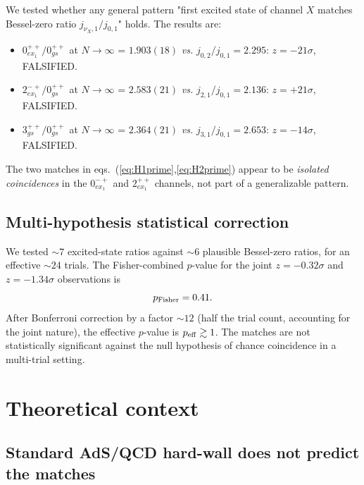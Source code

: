 \documentclass[reprint,prd,amsmath,amssymb,nofootinbib,superscriptaddress]{revtex4-2}
\newcommand{\jbz}[2]{j_{#1,#2}}      %
\begin{document}
We tested whether any general pattern "first excited state of channel $X$ matches Bessel-zero ratio $\jbz{\nu_X}{1}/\jbz{0}{1}$" holds. The results are:

\begin{itemize}
  \item $0^{++}_{ex_1}/0^{++}_{gs}$ at $N \to \infty$ = $1.903(18)$ \emph{vs.} $\jbz{0}{2}/\jbz{0}{1} = 2.295$: $z = -21\sigma$, FALSIFIED.
  \item $2^{-+}_{ex_1}/0^{++}_{gs}$ at $N \to \infty$ = $2.583(21)$ \emph{vs.} $\jbz{2}{1}/\jbz{0}{1} = 2.136$: $z = +21\sigma$, FALSIFIED.
  \item $3^{++}_{gs}/0^{++}_{gs}$ at $N \to \infty$ = $2.364(21)$ \emph{vs.} $\jbz{3}{1}/\jbz{0}{1} = 2.653$: $z = -14\sigma$, FALSIFIED.
\end{itemize}

The two matches in eqs.~(\ref{eq:H1prime},\ref{eq:H2prime}) appear to be \emph{isolated coincidences} in the $0^{-+}_{ex_1}$ and $2^{++}_{ex_1}$ channels, not part of a generalizable pattern.

\subsection{Multi-hypothesis statistical correction}

We tested $\sim 7$ excited-state ratios against $\sim 6$ plausible Bessel-zero ratios, for an effective $\sim 24$ trials. The Fisher-combined $p$-value for the joint $z = -0.32\sigma$ and $z = -1.34\sigma$ observations is
\begin{equation}
  p_{\rm Fisher} = 0.41.
\end{equation}
After Bonferroni correction by a factor $\sim 12$ (half the trial count, accounting for the joint nature), the effective $p$-value is $p_{\rm eff} \gtrsim 1$. The matches are not statistically significant against the null hypothesis of chance coincidence in a multi-trial setting.

\section{Theoretical context}
\label{sec:theory}

\subsection{Standard AdS/QCD hard-wall does not predict the matches}
\end{document}
